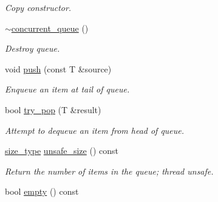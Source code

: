 \begin{DoxyCompactItemize}
\begin{DoxyCompactList}\small\item\em Copy constructor. \end{DoxyCompactList}\item 
\hypertarget{classtbb_1_1strict__ppl_1_1concurrent__queue_aa0056b242f280f5e25332ce998f9f670}{}\hyperlink{classtbb_1_1strict__ppl_1_1concurrent__queue_aa0056b242f280f5e25332ce998f9f670}{$\sim$concurrent\+\_\+queue} ()\label{classtbb_1_1strict__ppl_1_1concurrent__queue_aa0056b242f280f5e25332ce998f9f670}

\begin{DoxyCompactList}\small\item\em Destroy queue. \end{DoxyCompactList}\item 
\hypertarget{classtbb_1_1strict__ppl_1_1concurrent__queue_a9330ca6590980d80ef7b1ea3613a699a}{}void \hyperlink{classtbb_1_1strict__ppl_1_1concurrent__queue_a9330ca6590980d80ef7b1ea3613a699a}{push} (const T \&source)\label{classtbb_1_1strict__ppl_1_1concurrent__queue_a9330ca6590980d80ef7b1ea3613a699a}

\begin{DoxyCompactList}\small\item\em Enqueue an item at tail of queue. \end{DoxyCompactList}\item 
bool \hyperlink{classtbb_1_1strict__ppl_1_1concurrent__queue_aabb1acef18196fa11ed7db8e046c3943}{try\+\_\+pop} (T \&result)
\begin{DoxyCompactList}\small\item\em Attempt to dequeue an item from head of queue. \end{DoxyCompactList}\item 
\hypertarget{classtbb_1_1strict__ppl_1_1concurrent__queue_aad4b253ba595637b0b146eb6565556f2}{}\hyperlink{classtbb_1_1strict__ppl_1_1concurrent__queue_a9f883e49afea16293ba92da779981bb8}{size\+\_\+type} \hyperlink{classtbb_1_1strict__ppl_1_1concurrent__queue_aad4b253ba595637b0b146eb6565556f2}{unsafe\+\_\+size} () const \label{classtbb_1_1strict__ppl_1_1concurrent__queue_aad4b253ba595637b0b146eb6565556f2}

\begin{DoxyCompactList}\small\item\em Return the number of items in the queue; thread unsafe. \end{DoxyCompactList}\item 
\hypertarget{classtbb_1_1strict__ppl_1_1concurrent__queue_aeda3156929d0c250faed7b807ca6ab0e}{}bool \hyperlink{classtbb_1_1strict__ppl_1_1concurrent__queue_aeda3156929d0c250faed7b807ca6ab0e}{empty} () const \label{classtbb_1_1strict__ppl_1_1concurrent__queue_aeda3156929d0c250faed7b807ca6ab0e}


\end{DoxyCompactItemize}

